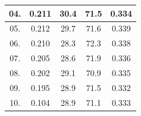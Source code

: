 \documentclass[a4paper,12pt]{article}
\begin{document}
\begin{table}[H]
\begin{tabular}{|c|c|c|c|c|}
			04.                                                          & 0.211                                                                      & 30.4                                                                      & 71.5                                                                             & 0.334                                                                            \\ \hline
			05.                                                          & 0.212                                                                      & 29.7                                                                      & 71.6                                                                             & 0.339                                                                            \\ \hline
			06.                                                          & 0.210                                                                      & 28.3                                                                      & 72.3                                                                             & 0.338                                                                            \\ \hline
			07.                                                          & 0.205                                                                      & 28.6                                                                      & 71.9                                                                             & 0.336                                                                            \\ \hline
			08.                                                          & 0.202                                                                      & 29.1                                                                      & 70.9                                                                             & 0.335                                                                            \\ \hline
			09.                                                          & 0.195                                                                      & 28.9                                                                      & 71.5                                                                             & 0.332                                                                            \\ \hline
			10.                                                          & 0.104                                                                      & 28.9                                                                      & 71.1                                                                             & 0.333                                                                            \\ \hline

\end{tabular}
\end{table}
\end{document}
